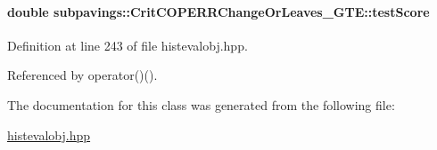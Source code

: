 \hypertarget{classsubpavings_1_1CritCOPERRChangeOrLeaves__GTE_a2743d2cdbbd6042afda9450aa97a7e2b}{
\paragraph[{test\-Score}]{\setlength{\rightskip}{0pt plus 5cm}double {\bf subpavings\-::\-Crit\-C\-O\-P\-E\-R\-R\-Change\-Or\-Leaves\-\_\-\-G\-T\-E\-::test\-Score}}}\label{classsubpavings_1_1CritCOPERRChangeOrLeaves__GTE_a2743d2cdbbd6042afda9450aa97a7e2b}


\-Definition at line 243 of file histevalobj.\-hpp.



\-Referenced by operator()().



\-The documentation for this class was generated from the following file\-:\begin{DoxyCompactItemize}
\item 
\hyperlink{histevalobj_8hpp}{histevalobj.\-hpp}\end{DoxyCompactItemize}
